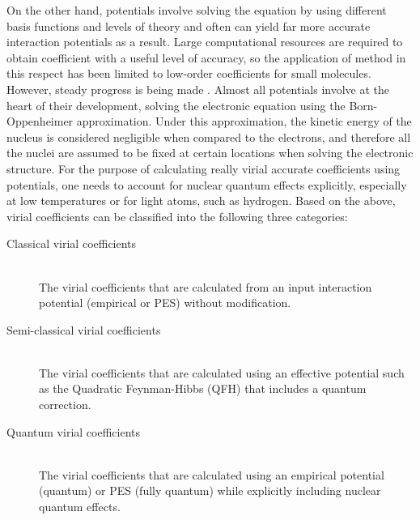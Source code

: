         On the other hand, \abinitio{} potentials involve solving the \Schrodinger{} equation by using different basis functions and levels of theory and often can yield far more accurate interaction potentials as a result. Large computational resources are required to obtain coefficient with a useful level of accuracy, so the application of \abinitio{} method in this respect has been limited to low-order coefficients for small molecules. However, steady progress is being made \cite{Boothroyd2003,Hodges2004,Garberoglio2012,Shaul2012,Garberoglio2013,Hellmann2013,Garberoglio2014,Garberoglio2014mix,Hellmann2014,Schultz2015,Tat2015}. Almost all \abinitio{} potentials involve at the heart of their development, solving the electronic \Schrodinger{} equation using the Born-Oppenheimer approximation. Under this approximation, the kinetic energy of the nucleus is considered negligible when compared to the electrons, and therefore all the nuclei are assumed to be fixed at certain locations when solving the electronic structure. For the purpose of calculating really virial accurate coefficients using \abinitio{} potentials, one needs to account for nuclear quantum effects explicitly, especially at low temperatures or for light atoms, such as hydrogen. Based on the above, virial coefficients can be classified into the following three categories:

        \begin{description}
            \item[Classical virial coefficients] \hfill \\
                The virial coefficients that are calculated from an input interaction potential (empirical or \abinitio{} PES) without modification.
            \item[Semi-classical virial coefficients] \hfill \\
                The virial coefficients that are calculated using an effective potential such as the Quadratic Feynman-Hibbs (QFH) \cite{Feynman} that includes a quantum correction.
            \item[Quantum virial coefficients] \hfill \\
                The virial coefficients that are calculated using an empirical potential (quantum) or \abinitio{} PES (fully quantum) while explicitly including nuclear quantum effects.
        \end{description}
